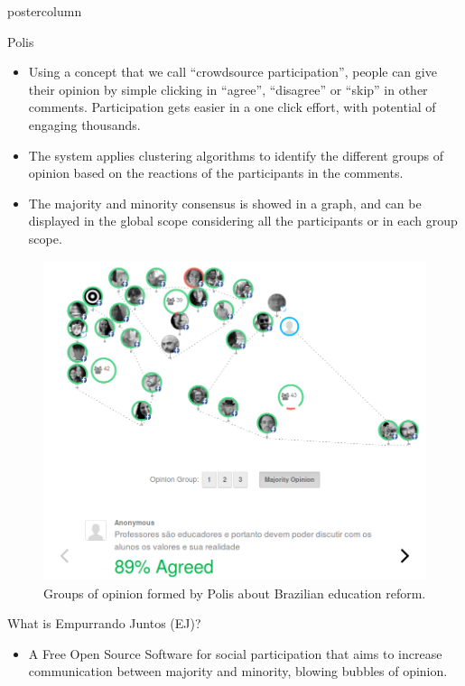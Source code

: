 \documentclass[final,hyperref={pdfpagelabels=false}]{beamer}
\begin{document}
\begin{frame}
\begin{columns}
\begin{column}{.49\textwidth}
\begin{beamercolorbox}[center,wd=\textwidth]{postercolumn}
\begin{minipage}[T]{.95\textwidth}
{\begin{block}{Polis}
\begin{itemize}
    \item Using a concept that we call ``crowdsource participation'', people can
    give their opinion by simple clicking in ``agree'', ``disagree'' or ``skip''
    in other  comments. Participation gets easier in a one click effort, with
    potential of engaging thousands.

    \item The system applies clustering algorithms to identify the different groups
    of opinion based on the reactions of the participants in the comments.

    \item The majority and minority consensus is showed in a graph, and can be
    displayed in the global scope considering all the participants or in each group
    scope.
  \end{itemize}

  \begin{figure}
    \begin{center}
      \includegraphics[scale=1.1]{../images/polis3.png}
      \caption{Groups of opinion formed by Polis about Brazilian education reform.}
      \label{fig:group-clusters}
    \end{center}
  \end{figure}
\end{block}

\begin{block}{What is Empurrando Juntos (EJ)?}

  \begin{itemize}
    \item A Free Open Source Software for social participation that aims to
    increase communication between majority and minority, blowing bubbles of
    opinion.


\end{itemize}
\end{block}}
\end{minipage}
\end{beamercolorbox}
\end{column}
\end{columns}
\end{frame}
\end{document}
